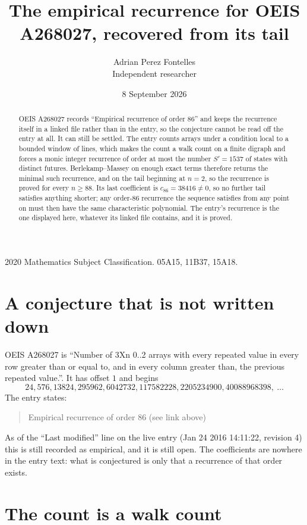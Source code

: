 \documentclass[11pt,a4paper]{article}
\title{The empirical recurrence for OEIS A268027, recovered from its tail}
\author{Adrian Perez Fontelles\\ \small Independent researcher}
\date{8 September 2026}
\theoremstyle{plain}
\theoremstyle{definition}
\begin{document}
\maketitle

\begin{abstract}
OEIS A268027 records ``Empirical recurrence of order $86$'' and keeps the recurrence itself in
a linked file rather than in the entry, so the conjecture cannot be read off the entry at all.
It can still be settled. The entry counts arrays under a condition local to a bounded window of
lines, which makes the count a walk count on a finite digraph and forces a monic integer
recurrence of order at most the number $S'=1537$ of states with distinct futures. Berlekamp--Massey on
enough exact terms therefore returns the minimal such recurrence, and on the tail beginning at $n=2$, so the recurrence is proved for every $n\ge88$.
Its last coefficient is $c_{86}=38416\neq0$, so no further tail satisfies anything
shorter; any order-$86$ recurrence the sequence satisfies from any point on must then have
the same characteristic polynomial. The entry's recurrence is the one displayed here, whatever
its linked file contains, and it is proved.
\end{abstract}

\noindent\small 2020 Mathematics Subject Classification. 05A15, 11B37, 15A18.\normalsize

\section{A conjecture that is not written down}

OEIS A268027 is ``Number of 3Xn 0..2 arrays with every repeated value in every row greater than or equal to, and in every column greater than, the previous repeated value.''. It has offset $1$ and begins
\[
24, 576, 13824, 295962, 6042732, 117582228, 2205234900, 40088968398,\ \dots
\]
The entry states:
\begin{quote}
Empirical recurrence of order 86 (see link above)
\end{quote}
As of the ``Last modified'' line on the live entry (Jan 24 2016 14:11:22, revision 4)
this is still recorded as empirical, and it is still open. The coefficients are nowhere in the
entry text: what is conjectured is only that a recurrence of that order exists.

\section{The count is a walk count}
\end{document}
